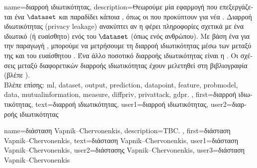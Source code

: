 {name={\foreignlanguage{greek}{διαρροή ιδιωτικότητας}},
	description={\foreignlanguage{greek}{Θεωρούμε μία εφαρμογή} 
		 \foreignlanguage{greek}{που επεξεργάζεται ένα}  $\dataset$ \foreignlanguage{greek}{και 
		παραδίδει κάποια} , \foreignlanguage{greek}{όπως οι}  \foreignlanguage{greek}{που 
		προκύπτουν για νέα} . \foreignlanguage{greek}{Διαρροή ιδιωτικότητας} (privacy leakage) 
		\foreignlanguage{greek}{ανακύπτει αν η}  \foreignlanguage{greek}{φέρει πληροφορίες σχετικά με ένα ιδιωτικό (ή 
		ευαίσθητο)}  \foreignlanguage{greek}{ενός}  \foreignlanguage{greek}{του $\dataset$ (όπως 
		ενός ανθρώπου). Με βάση ένα}  \foreignlanguage{greek}{για την παραγωγή} , 
		\foreignlanguage{greek}{μπορούμε να μετρήσουμε τη διαρροή ιδιωτικότητας μέσω των}  
		\foreignlanguage{greek}{μεταξύ της}  \foreignlanguage{greek}{και του ευαίσθητου} . 
		\foreignlanguage{greek}{Ένα άλλο ποσοτικό}  \foreignlanguage{greek}{διαρροής ιδιωτικότητας είναι η} 
		. \foreignlanguage{greek}{Οι σχέσεις μεταξύ διαφορετικών}  
		\foreignlanguage{greek}{διαρροής ιδιωτικότητας έχουν μελετηθεί στη βιβλιογραφία (βλέπε} \cite{InfThDiffPriv}).
		\\
		\foreignlanguage{greek}{Βλέπε επίσης:} \gls{ml}, \gls{dataset}, \gls{output}, \gls{prediction}, \gls{datapoint}, \gls{feature}, \gls{probmodel}, 
		\gls{data}, \gls{mutualinformation}, \gls{measure}, \gls{diffpriv}, \gls{privattack}, \gls{gdpr}. }, 
	first={\foreignlanguage{greek}{διαρροή ιδιωτικότητας}}, 
	text={\foreignlanguage{greek}{διαρροή ιδιωτικότητας}},
	user1={\foreignlanguage{greek}{διαρροή ιδιωτικότητας}}, %
   	user2={\foreignlanguage{greek}{διαρροής ιδιωτικότητας}} %
}

{name={\foreignlanguage{greek}{διάσταση} Vapnik–Chervonenkis},
	description={TBC. },
	first={\foreignlanguage{greek}{διάσταση} Vapnik–Chervonenkis},
	text={\foreignlanguage{greek}{διάσταση} Vapnik–Chervonenkis},
	user1={\foreignlanguage{greek}{διάσταση} Vapnik–Chervonenkis}, %
	user2={\foreignlanguage{greek}{διάστασης} Vapnik–Chervonenkis}, %
	user3={\foreignlanguage{greek}{διάσταση} Vapnik–Chervonenkis} %
}

